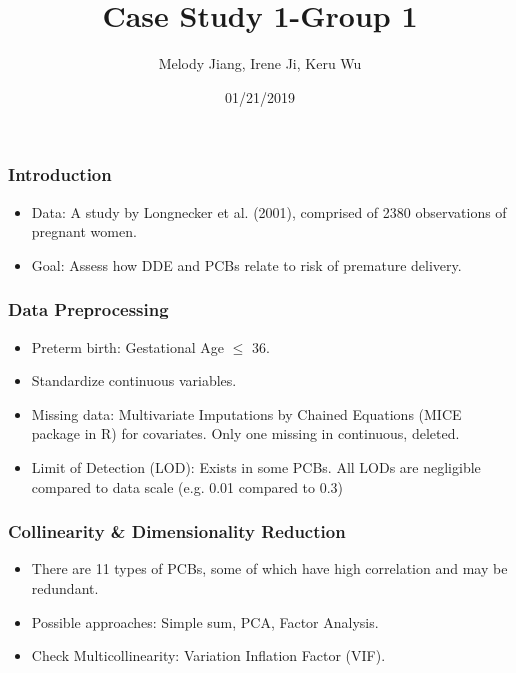\documentclass{beamer}
\title{Case Study 1-Group 1}
\author{Melody Jiang, Irene Ji, Keru Wu}
\institute{Department of Statistical Science, Duke University}
\date{01/21/2019}
\begin{document}
\frame{\titlepage}





\begin{frame}
\frametitle{Introduction}

\begin{itemize}
\item Data: A study by Longnecker et al. (2001), comprised of 2380 observations of pregnant women.
  
\item Goal: Assess how DDE and PCBs relate to risk of premature delivery.

\end{itemize}

\end{frame}







\begin{frame}
\frametitle{Data Preprocessing}
\begin{itemize}

\item Preterm birth: Gestational Age $\leq$ 36.
\pause
\item Standardize continuous variables.
\pause
\item Missing data: Multivariate Imputations by Chained Equations (MICE package in R) for covariates. Only one missing in continuous, deleted.
\pause
\item Limit of Detection (LOD): Exists in some PCBs. All LODs are negligible compared to data scale (e.g. 0.01 compared to 0.3)

\end{itemize}
\end{frame}




\begin{frame}
\frametitle{Collinearity \& Dimensionality Reduction}

\begin{itemize}

\item There are 11 types of PCBs, some of which have high correlation and may be redundant.
\pause
\item Possible approaches: Simple sum, PCA, Factor Analysis.
\pause
\item Check Multicollinearity: Variation Inflation Factor (VIF).

\end{itemize}
\end{frame}
\end{document}
